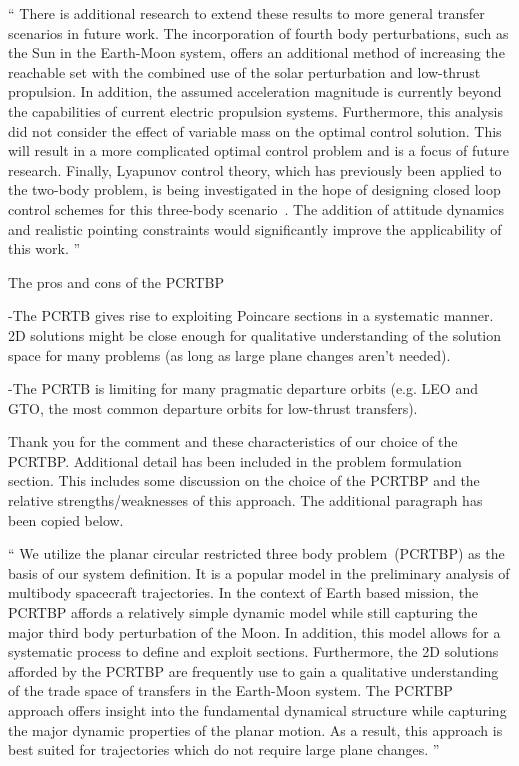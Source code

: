 \documentclass[11pt]{article}
\newenvironment{correction}{\begin{list}{}{\setlength{\leftmargin}{1cm}\setlength{\rightmargin}{1cm}}\vspace{\parsep}\item[]``}{''\end{list}}
\begin{document}
\begin{itemize}
\begin{correction}
There is additional research to extend these results to more general transfer scenarios in future work.
The incorporation of fourth body perturbations, such as the Sun in the Earth-Moon system, offers an additional method of increasing the reachable set with the combined use of the solar perturbation and low-thrust propulsion.
In addition, the assumed acceleration magnitude is currently beyond the capabilities of current electric propulsion systems.
Furthermore, this analysis did not consider the effect of variable mass on the optimal control solution.
This will result in a more complicated optimal control problem and is a focus of future research.
Finally, Lyapunov control theory, which has previously been applied to the two-body problem, is being investigated in the hope of designing closed loop control schemes for this three-body scenario~\cite{chang2002}.
The addition of attitude dynamics and realistic pointing constraints would significantly improve the applicability of this work.
\end{correction}

\item 
    \begin{itshape}
The pros and cons of the PCRTBP

-The PCRTB gives rise to exploiting Poincare sections in a systematic manner.  2D solutions might be close enough for qualitative understanding of the solution space for many problems (as long as large plane changes aren't needed).

-The PCRTB is limiting for many pragmatic departure orbits (e.g. LEO and GTO, the most common departure orbits for low-thrust transfers).
\end{itshape}

Thank you for the comment and these characteristics of our choice of the PCRTBP.
Additional detail has been included in the problem formulation section.
This includes some discussion on the choice of the PCRTBP and the relative strengths/weaknesses of this approach.
The additional paragraph has been copied below.

\begin{correction}
We utilize the planar circular restricted three body problem~(PCRTBP) as the basis of our system definition. 
It is a popular model in the preliminary analysis of multibody spacecraft trajectories. 
In the context of Earth based mission, the PCRTBP affords a relatively simple dynamic model while still capturing the major third body perturbation of the Moon.
In addition, this model allows for a systematic process to define and exploit \Poincare sections.
Furthermore, the 2D solutions afforded by the PCRTBP are frequently use to gain a qualitative understanding of the trade space of transfers in the Earth-Moon system.
The PCRTBP approach offers insight into the fundamental dynamical structure while capturing the major dynamic properties of the planar motion.
As a result, this approach is best suited for trajectories which do not require large plane changes.
\end{correction}


\end{itemize}
\end{document}
